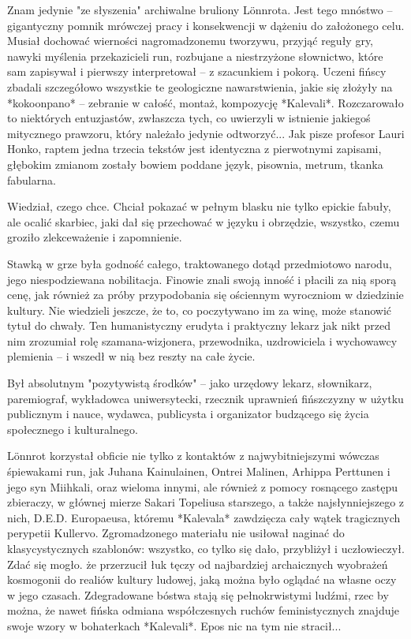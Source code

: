 Znam jedynie "ze słyszenia" archiwalne bruliony Lönnrota. Jest tego mnóstwo -- gigantyczny pomnik mrówczej pracy i konsekwencji w dążeniu do założonego celu. Musiał dochować wierności nagromadzonemu tworzywu, przyjąć reguły gry, nawyki myślenia przekazicieli run, rozbujane a niestrzyżone słownictwo, które sam zapisywał i pierwszy interpretował -- z szacunkiem i pokorą. Uczeni fińscy zbadali szczegółowo wszystkie te geologiczne nawarstwienia, jakie się złożyły na *kokoonpano* -- zebranie w całość, montaż, kompozycję *Kalevali*. Rozczarowało to niektórych entuzjastów, zwłaszcza tych, co uwierzyli w istnienie jakiegoś mitycznego prawzoru, który należało jedynie odtworzyć... Jak pisze profesor Lauri Honko, raptem jedna trzecia tekstów jest identyczna z pierwotnymi zapisami, głębokim zmianom zostały bowiem poddane język, pisownia, metrum, tkanka fabularna.

Wiedział, czego chce. Chciał pokazać w pełnym blasku nie tylko epickie fabuły, ale ocalić skarbiec, jaki dał się przechować w języku i obrzędzie, wszystko, czemu groziło zlekceważenie i zapomnienie.

Stawką w grze była godność całego, traktowanego dotąd przedmiotowo narodu, jego niespodziewana nobilitacja. Finowie znali swoją inność i płacili za nią sporą cenę, jak również za próby przypodobania się ościennym wyroczniom w dziedzinie kultury. Nie wiedzieli jeszcze, że to, co poczytywano im za winę, może stanowić tytuł do chwały. Ten humanistyczny erudyta i praktyczny lekarz jak nikt przed nim zrozumiał rolę szamana-wizjonera, przewodnika, uzdrowiciela i wychowawcy plemienia -- i wszedł w nią bez reszty na całe życie.

Był absolutnym "pozytywistą środków" -- jako urzędowy lekarz, słownikarz, paremiograf, wykładowca uniwersytecki, rzecznik uprawnień fińszczyzny w użytku publicznym i nauce, wydawca, publicysta i organizator budzącego się życia społecznego i kulturalnego.

Lönnrot korzystał obficie nie tylko z kontaktów z najwybitniejszymi wówczas śpiewakami run, jak Juhana Kainulainen, Ontrei Malinen, Arhippa Perttunen i jego syn Miihkali, oraz wieloma innymi, ale również z pomocy rosnącego zastępu zbieraczy, w głównej mierze Sakari Topeliusa starszego, a także najsłynniejszego z nich, D.E.D. Europaeusa, któremu *Kalevala* zawdzięcza cały wątek tragicznych perypetii Kullervo. Zgromadzonego materiału nie usiłował naginać do klasycystycznych szablonów: wszystko, co tylko się dało, przybliżył i uczłowieczył. Zdać się mogło. że przerzucił łuk tęczy od najbardziej archaicznych wyobrażeń kosmogonii do realiów kultury ludowej, jaką można było oglądać na własne oczy w jego czasach. Zdegradowane bóstwa stają się pełnokrwistymi ludźmi, rzec by można, że nawet fińska odmiana współczesnych ruchów feministycznych znajduje swoje wzory w bohaterkach *Kalevali*. Epos nic na tym nie stracił...

